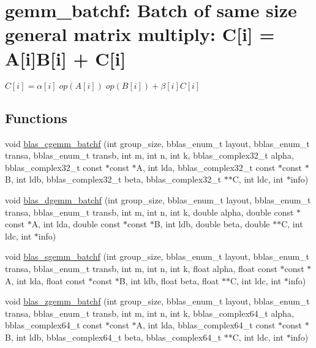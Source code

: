 \hypertarget{group__gemm__batchf}{}\section{gemm\+\_\+batchf\+: Batch of same size general matrix multiply\+: C\mbox{[}i\mbox{]} = A\mbox{[}i\mbox{]}B\mbox{[}i\mbox{]} + C\mbox{[}i\mbox{]}}
\label{group__gemm__batchf}


$ C[i] = \alpha[i] \;op(A[i]) \;op(B[i]) + \beta[i] C[i] $  


\subsection*{Functions}
\begin{DoxyCompactItemize}
\item 
void \mbox{\hyperlink{group__gemm__batchf_ga7638ee53c76c8e1b40dffa9574f5cbad}{blas\+\_\+cgemm\+\_\+batchf}} (int group\+\_\+size, bblas\+\_\+enum\+\_\+t layout, bblas\+\_\+enum\+\_\+t transa, bblas\+\_\+enum\+\_\+t transb, int m, int n, int k, bblas\+\_\+complex32\+\_\+t alpha, bblas\+\_\+complex32\+\_\+t const $\ast$const $\ast$A, int lda, bblas\+\_\+complex32\+\_\+t const $\ast$const $\ast$B, int ldb, bblas\+\_\+complex32\+\_\+t beta, bblas\+\_\+complex32\+\_\+t $\ast$$\ast$C, int ldc, int $\ast$info)
\item 
void \mbox{\hyperlink{group__gemm__batchf_gaa3c403cc8465c276b39d139275e5c0bd}{blas\+\_\+dgemm\+\_\+batchf}} (int group\+\_\+size, bblas\+\_\+enum\+\_\+t layout, bblas\+\_\+enum\+\_\+t transa, bblas\+\_\+enum\+\_\+t transb, int m, int n, int k, double alpha, double const $\ast$const $\ast$A, int lda, double const $\ast$const $\ast$B, int ldb, double beta, double $\ast$$\ast$C, int ldc, int $\ast$info)
\item 
void \mbox{\hyperlink{group__gemm__batchf_ga5b47cbf645948cf526faafecdd56ff35}{blas\+\_\+sgemm\+\_\+batchf}} (int group\+\_\+size, bblas\+\_\+enum\+\_\+t layout, bblas\+\_\+enum\+\_\+t transa, bblas\+\_\+enum\+\_\+t transb, int m, int n, int k, float alpha, float const $\ast$const $\ast$A, int lda, float const $\ast$const $\ast$B, int ldb, float beta, float $\ast$$\ast$C, int ldc, int $\ast$info)
\item 
void \mbox{\hyperlink{group__gemm__batchf_ga2b91753e96ae9bd05c75ebedd35cfce8}{blas\+\_\+zgemm\+\_\+batchf}} (int group\+\_\+size, bblas\+\_\+enum\+\_\+t layout, bblas\+\_\+enum\+\_\+t transa, bblas\+\_\+enum\+\_\+t transb, int m, int n, int k, bblas\+\_\+complex64\+\_\+t alpha, bblas\+\_\+complex64\+\_\+t const $\ast$const $\ast$A, int lda, bblas\+\_\+complex64\+\_\+t const $\ast$const $\ast$B, int ldb, bblas\+\_\+complex64\+\_\+t beta, bblas\+\_\+complex64\+\_\+t $\ast$$\ast$C, int ldc, int $\ast$info)
\end{DoxyCompactItemize}


